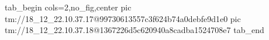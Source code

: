 
 
 
 
 

\qqSecCmtScr


\ifcmt
  tab_begin cols=2,no_fig,center
    pic tm://18_12_22.10.37.17@99730613557c3f624b74a0debfe9d1e0
    pic tm://18_12_22.10.37.18@1367226d5c620940a8cadba1524708e7
  tab_end
\fi


